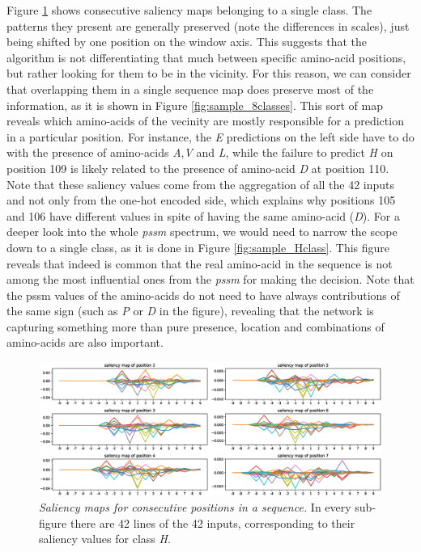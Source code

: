 	Figure \ref{fig:sliding} shows consecutive saliency maps belonging to a single class. The patterns they present are generally preserved (note the differences in scales), just being shifted by one position on the window axis. This suggests that the algorithm is not differentiating that much between specific amino-acid positions, but rather looking for them to be in the vicinity. For this reason, we can consider that overlapping them in a single sequence map does preserve most of the information, as it is shown in Figure \ref{fig:sample_8classes}. This sort of map reveals which amino-acids of the vecinity are mostly responsible for a prediction in a particular position. For instance, the \textit{E} predictions on the left side have to do with the presence of amino-acids \textit{A},\textit{V} and \textit{L}, while the failure to predict \textit{H} on position 109 is likely related to the presence of amino-acid \textit{D} at position 110. Note that these saliency values come from the aggregation of all the 42 inputs and not only from the one-hot encoded side, which explains why positions 105 and 106 have different values in spite of having the same amino-acid (\textit{D}). For a deeper look into the whole \textit{pssm} spectrum, we would need to narrow the scope down to a single class, as it is done in Figure \ref{fig:sample_Hclass}. This figure reveals that indeed is common that the real amino-acid in the sequence is not among the most influential ones from the \textit{pssm} for making the decision. Note that the pssm values of the amino-acids do not need to have always contributions of the same sign (such as \textit{P} or \textit{D} in the figure), revealing that the network is capturing something more than pure presence, location and combinations of amino-acids are also important.
	
	\begin{figure}
	\centering
	\includegraphics[width=1\linewidth]{Figures/sliding}
	\caption{\textit{Saliency maps for consecutive positions in a sequence.} In every sub-figure there are 42 lines of the 42 inputs, corresponding to their saliency values for class \textit{H}.}
	\label{fig:sliding}
	\end{figure}

